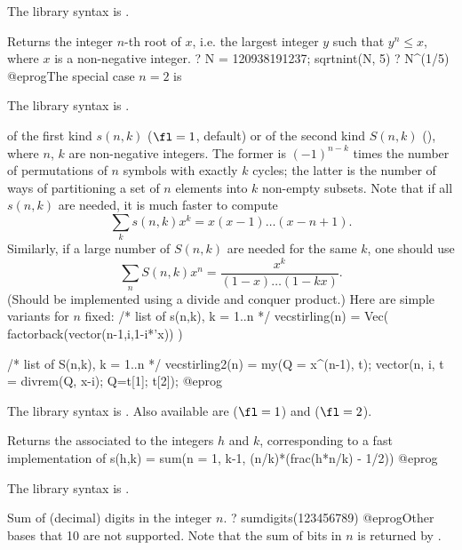 The library syntax is .

\label{se:sqrtnint}
Returns the integer $n$-th root of $x$, i.e. the largest integer $y$ such
that $y^n \leq x$, where $x$ is a non-negative integer.
\bprog
? N = 120938191237; sqrtnint(N, 5)
? N^(1/5)
@eprog\noindent The special case $n = 2$ is 

The library syntax is .

\label{se:stirling}
 of the first kind $s(n,k)$ ($\fl=1$, default) or
of the second kind $S(n,k)$ (), where $n$, $k$ are non-negative
integers. The former is $(-1)^{n-k}$ times the
number of permutations of $n$ symbols with exactly $k$ cycles; the latter is
the number of ways of partitioning a set of $n$ elements into $k$ non-empty
subsets. Note that if all $s(n,k)$ are needed, it is much faster to compute
$$\sum_k s(n,k) x^k = x(x-1)\dots(x-n+1).$$
Similarly, if a large number of $S(n,k)$ are needed for the same $k$,
one should use
$$\sum_n S(n,k) x^n = \dfrac{x^k}{(1-x)\dots(1-kx)}.$$
(Should be implemented using a divide and conquer product.) Here are
simple variants for $n$ fixed:
\bprog
/* list of s(n,k), k = 1..n */
vecstirling(n) = Vec( factorback(vector(n-1,i,1-i*'x)) )

/* list of S(n,k), k = 1..n */
vecstirling2(n) =
{ my(Q = x^(n-1), t);
  vector(n, i, t = divrem(Q, x-i); Q=t[1]; t[2]);
}
@eprog

The library syntax is .
Also available are 
($\fl=1$) and  ($\fl=2$).

\label{se:sumdedekind}
Returns the  associated to the integers $h$ and $k$,
 corresponding to a fast implementation of
 \bprog
  s(h,k) = sum(n = 1, k-1, (n/k)*(frac(h*n/k) - 1/2))
 @eprog

The library syntax is .

\label{se:sumdigits}
Sum of (decimal) digits in the integer $n$.
\bprog
? sumdigits(123456789)
@eprog\noindent Other bases that 10 are not supported. Note that the sum of
bits in $n$ is returned by .

